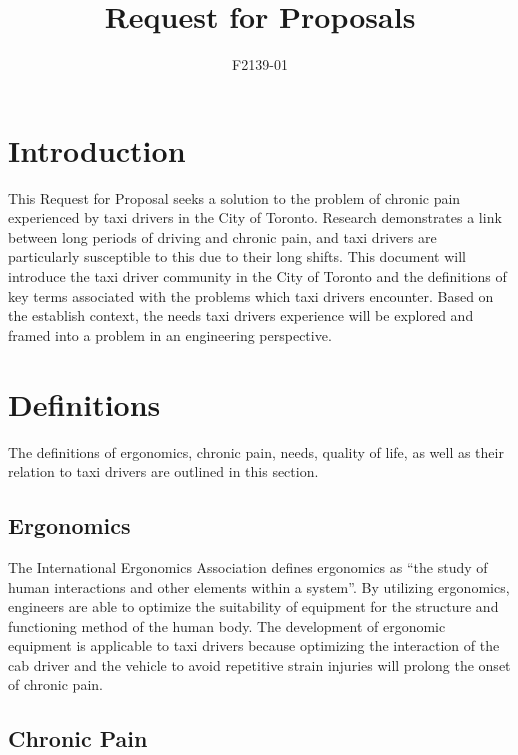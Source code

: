 \documentclass[11pt]{article}
\begin{document}
\title{Request for Proposals}
\author{F2139-01}
\maketitle
\begin{abstract}

\end{abstract}
\section{Introduction}
\label{sec:intro}
This Request for Proposal seeks a solution to the problem of chronic
pain experienced by taxi drivers in the City of Toronto. 
Research demonstrates a link between long periods of driving and 
chronic pain\cite{KneePain, Okunribido2008}, and taxi drivers are particularly 
susceptible to this due to their long shifts\cite{thestar2012}. This document
will introduce the taxi driver community in the City of Toronto and the 
definitions of key terms associated with the problems which taxi drivers encounter. 
Based on the establish context, the needs taxi drivers experience will be 
explored and framed into a problem in an engineering perspective. 

\section{Definitions}
\label{sec:defs}
The definitions of ergonomics, chronic pain, needs, quality of life, as
well as their relation to taxi drivers are outlined in this section.

\subsection{Ergonomics}
\label{sec:ergonomics}

The International Ergonomics Association defines ergonomics as “the
study of human interactions and other elements within a system”. By
utilizing ergonomics, engineers are able to optimize the suitability
of equipment for the structure and functioning method of the human
body. The development of ergonomic equipment is applicable to
taxi drivers because optimizing the interaction of the cab driver
and the vehicle to avoid repetitive strain injuries will prolong
the onset of chronic pain. 

\subsection{Chronic Pain}
\label{sec:pain}
\end{document}
